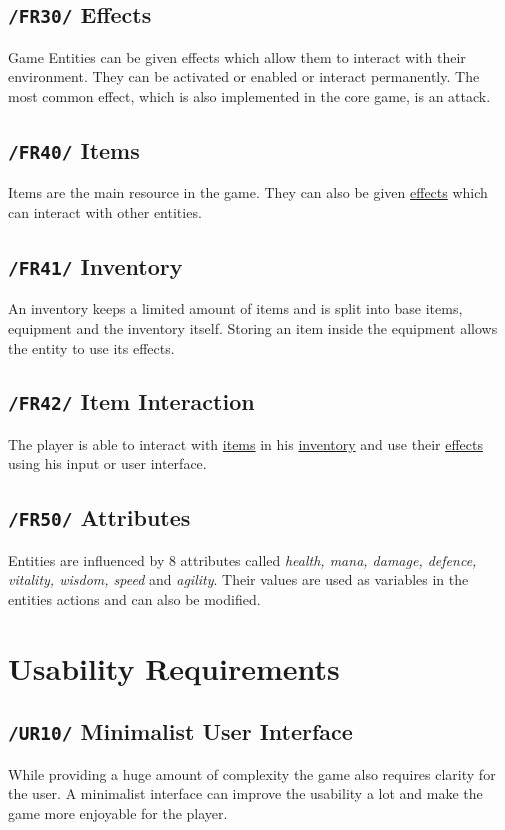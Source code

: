 \documentclass[11pt]{article}
\begin{document}
\subsection{\texttt{/FR30/} Effects}\label{subsec:fr30effects}
Game Entities can be given effects which allow them to interact with their environment.
They can be activated or enabled or interact permanently.
The most common effect, which is also implemented in the core game, is an attack.
\subsection{\texttt{/FR40/} Items}\label{subsec:fr40items}
Items are the main resource in the game. They can also be given \hyperref[subsec:fr30effects]{effects} which can interact with other entities.
\subsection{\texttt{/FR41/} Inventory}\label{subsec:fr41inventory}
An inventory keeps a limited amount of items and is split into base items, equipment and the inventory itself.
Storing an item inside the equipment allows the entity to use its effects.
\subsection{\texttt{/FR42/} Item Interaction}\label{subsec:pf22iteminteraction}
The player is able to interact with \hyperref[subsec:fr40items]{items} in his \hyperref[subsec:fr41inventory]{inventory} and use their \hyperref[subsec:fr30effects]{effects} using his input or user interface.
\subsection{\texttt{/FR50/} Attributes}\label{subsec:fr50attributes}
Entities are influenced by 8 attributes called \textit{health, mana, damage, defence, vitality, wisdom, speed} and \textit{agility}. Their values are used as variables in the entities actions and can also be modified.

\section{Usability Requirements}\label{sec:ur}
\subsection{\texttt{/UR10/} Minimalist User Interface}
While providing a huge amount of complexity the game also requires clarity for the user. A minimalist interface can improve the usability a lot and make the game more enjoyable for the player.
\end{document}
